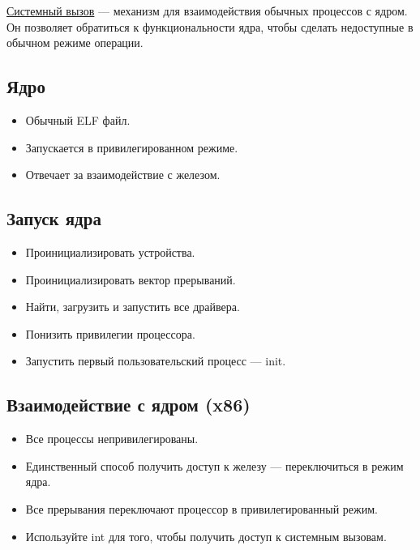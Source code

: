 \begin{multicols}{2}
      \begin{definition}{}{}
        \underline{Системный вызов} --- механизм для взаимодействия обычных процессов с ядром. 
        Он позволяет обратиться к функциональности ядра, чтобы сделать недоступные в обычном
        режиме операции.
      \end{definition}
      
      \subsection*{Ядро}
      
      \begin{itemize}
        \item Обычный ELF файл.
        \item Запускается в привилегированном режиме.
        \item Отвечает за взаимодействие с железом.
      \end{itemize}
      
      \subsection*{Запуск ядра}
      
      \begin{itemize}
        \item Проинициализировать устройства.
        \item Проинициализировать вектор прерываний.
        \item Найти, загрузить и запустить все драйвера.
        \item Понизить привилегии процессора.
        \item Запустить первый пользовательский процесс --- init.
      \end{itemize}
      
      \subsection*{Взаимодействие с ядром (x86)}
      
      \begin{itemize}
        \item Все процессы непривилегированы.
        \item Единственный способ получить доступ к железу --- переключиться в 
        режим ядра.
        \item Все прерывания переключают процессор в привилегированный режим.
        \item Используйте int для того, чтобы получить доступ к системным вызовам.
      \end{itemize}
      

\end{multicols}
